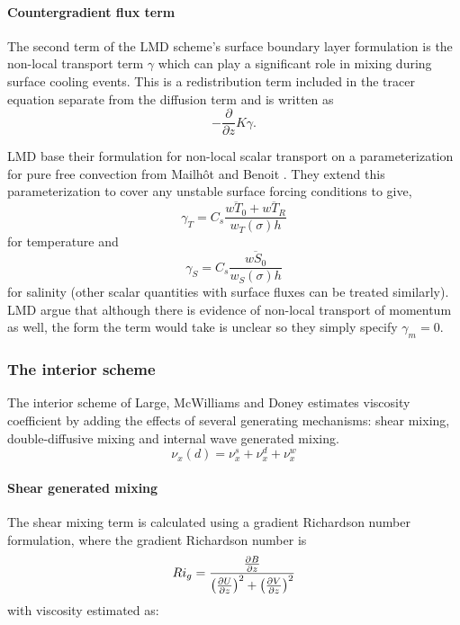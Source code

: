 \paragraph{Countergradient flux term}
The second term of the LMD scheme's surface boundary layer
formulation is the non-local transport term $\gamma$ which can play a
significant role in mixing during surface cooling events.  This is a
redistribution term included in the tracer equation separate from the
diffusion term and is written as 
\begin{equation}
-\frac{\partial}{\partial z}K\gamma.
\end{equation}

LMD base their formulation for non-local scalar transport on a
parameterization for pure free convection from Mailh\^ot and
Benoit \cite{Mailhot82}. They extend this parameterization to cover any
unstable surface forcing conditions to give,
\begin{equation}
  \gamma_{T}=C_s\frac{\overline{wT_0}+
  \overline{wT_R}}{w_T(\sigma)h}
\end{equation}
for temperature and 
\begin{equation}
\gamma_S=C_s \frac{\overline{wS_0}}{w_S(\sigma)h}
\end{equation}
for salinity (other scalar quantities with surface fluxes can be
treated similarly). LMD argue that although there is evidence of
non-local transport of momentum as well, the form the term would take
is unclear so they simply specify $\gamma_m=0$.

\subsubsection{The interior scheme}
The interior scheme of Large, McWilliams and Doney estimates viscosity
coefficient by adding the effects of several generating mechanisms:
shear mixing, double-diffusive mixing and internal wave generated
mixing.
\begin{equation}
\nu_{x}(d)=\nu_{x}^s+\nu_{x}^d+\nu_{x}^w
\end{equation}

\paragraph{Shear generated mixing}
The shear mixing term is calculated using a
gradient Richardson number formulation, where the gradient Richardson
number is
\begin{equation}
  Ri_g = { {\partial B \over \partial z} \over
  \left({\partial U \over \partial z}\right)^2 +
  \left({\partial V \over \partial z}\right)^2 }
\end{equation}
with viscosity
estimated as: 


